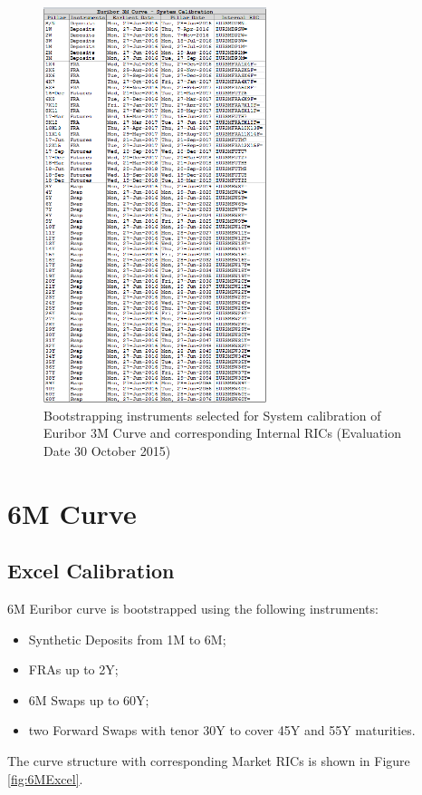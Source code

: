 \begin{figure}
\centering
\includegraphics[width=0.58\textwidth]{images/3MMx.png}
\caption{Bootstrapping instruments selected for System calibration of Euribor 3M Curve and corresponding Internal RICs (Evaluation Date 30 October 2015)}
\label{fig:3MMx}
\end{figure}

\section{6M Curve}

\subsection{Excel Calibration}

6M Euribor curve is bootstrapped using the following instruments:
\begin{itemize}
\item Synthetic Deposits from 1M to 6M; 
\item FRAs up to 2Y;
\item 6M Swaps up to 60Y;
\item two Forward Swaps with tenor 30Y to cover 45Y and 55Y maturities.
\end{itemize}
The curve structure with corresponding Market RICs is shown in Figure \ref{fig:6MExcel}.

